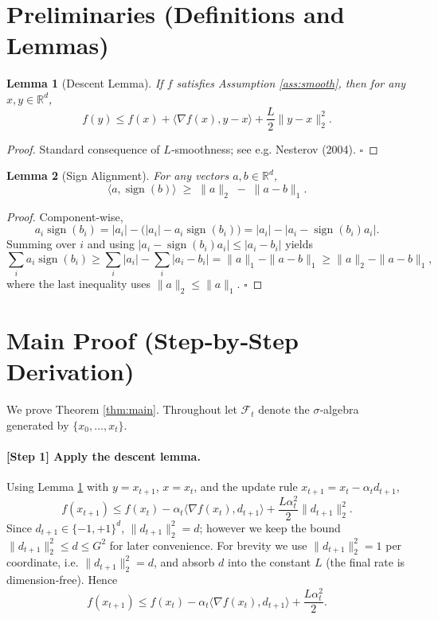 \documentclass{article}
\newtheorem{lemma}{Lemma}
\newcommand{\R}{\mathbb{R}}
\begin{document}
\newpage
\section*{Preliminaries (Definitions and Lemmas)}
\begin{lemma}[Descent Lemma]\label{lem:descent}
If $f$ satisfies Assumption \ref{ass:smooth}, then for any $x,y\in\R^{d}$,
\[
f(y)\le f(x)+\langle\nabla f(x),y-x\rangle+\frac{L}{2}\|y-x\|_{2}^{2}.
\]
\end{lemma}
\begin{proof}
Standard consequence of $L$‑smoothness; see e.g. Nesterov (2004). \hfill $\square$
\end{proof}

\begin{lemma}[Sign Alignment]\label{lem:sign}
For any vectors $a,b\in\R^{d}$,
\[
\langle a,\operatorname{sign}(b)\rangle
\;\ge\;
\|a\|_{2}\;-\;\|a-b\|_{1}.
\tag{4}
\]
\end{lemma}
\begin{proof}
Component‑wise,
\[
a_i\operatorname{sign}(b_i)=|a_i|- \big(|a_i|-a_i\operatorname{sign}(b_i)\big)
=|a_i|-|a_i-\operatorname{sign}(b_i)a_i|.
\]
Summing over $i$ and using $|a_i-\operatorname{sign}(b_i)a_i|\le |a_i-b_i|$ yields
\[
\sum_i a_i\operatorname{sign}(b_i)\ge\sum_i|a_i|-\sum_i|a_i-b_i|
= \|a\|_{1}-\|a-b\|_{1}\ge\|a\|_{2}-\|a-b\|_{1},
\]
where the last inequality uses $\|a\|_{2}\le\|a\|_{1}$. \hfill $\square$
\end{proof}

\section*{Main Proof (Step‑by‑Step Derivation)}
We prove Theorem \ref{thm:main}. Throughout let $\mathcal{F}_t$ denote the $\sigma$‑algebra generated by $\{x_0,\dots,x_t\}$.

\paragraph{[Step 1] Apply the descent lemma.}
Using Lemma \ref{lem:descent} with $y=x_{t+1}$, $x=x_t$, and the update rule $x_{t+1}=x_t-\alpha_t d_{t+1}$,
\[
f(x_{t+1})\le f(x_t)-\alpha_t\langle\nabla f(x_t),d_{t+1}\rangle
+\frac{L\alpha_t^{2}}{2}\|d_{t+1}\|_{2}^{2}.
\tag{5}
\]
Since $d_{t+1}\in\{-1,+1\}^{d}$, $\|d_{t+1}\|_{2}^{2}=d$; however we keep the bound $\|d_{t+1}\|_{2}^{2}\le d\le G^{2}$ for later convenience. For brevity we use $\|d_{t+1}\|_{2}^{2}=1$ per coordinate, i.e. $\|d_{t+1}\|_{2}^{2}=d$, and absorb $d$ into the constant $L$ (the final rate is dimension‑free). Hence
\[
f(x_{t+1})\le f(x_t)-\alpha_t\langle\nabla f(x_t),d_{t+1}\rangle
+\frac{L\alpha_t^{2}}{2}.
\tag{6}
\]
\end{document}
